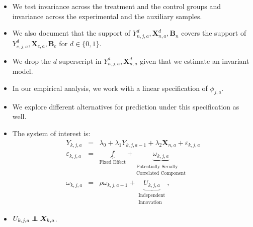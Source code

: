 \documentclass[static]{JJH-Beamer}
\newcommand\independent{\protect\mathpalette{\protect\independenT}{\perp}}
\def\independenT#1#2{\mathrel{\rlap{$#1#2$}\mkern2mu{#1#2}}}
\begin{document}
\begin{frame}

\begin{itemize}
\item We test invariance across the treatment and the control groups and invariance across the experimental and the auxiliary samples.
\item We also document that the support of $Y_{n,j,a}^d, \bm{X}_{n,a}^d, \bm{B}_{n}$ covers the support of $Y_{e,j,a}^d, \bm{X}_{e,a}, \bm{B}_{e}$ for $d \in \{0, 1\}$.
\item We drop the $d$ superscript in $Y_{n,j,a}^d, \bm{X}_{n,a}^d$ given that we estimate an invariant model.
\end{itemize}

\end{frame}

\begin{frame}

\begin{itemize}
\item In our empirical analysis, we work with a linear specification of $\phi_{j,a}$.
\item We explore different alternatives for prediction under this specification as well.
\item The system of interest is:
    \begin{eqnarray}
    Y_{k,j,a}  &=& \lambda_{0} + \lambda_{1} Y_{k,j,a-1} + \lambda_{2}  \bm{X}_{n,a} + \varepsilon_{k,j,a} \nonumber \\
    \varepsilon_{k,j,a} &=& \underbrace{f}_{\text{Fixed Effect}} + \underbrace{\omega_{k,j,a}}_{\substack{\text{Potentially Serially}\\ \text{Correlated Component}}} \nonumber \\
    \omega_{k,j,a}      &=& \rho \omega_{k,j,a-1} + \underbrace{U_{k,j,a}}_{\substack{\text{Independent}\\ \text{Innovation}}},
    \end{eqnarray}
\item $U_{k,j,a} \independent \bm{X}_{k,a}$.
\end{itemize}

\end{frame}
\end{document}
